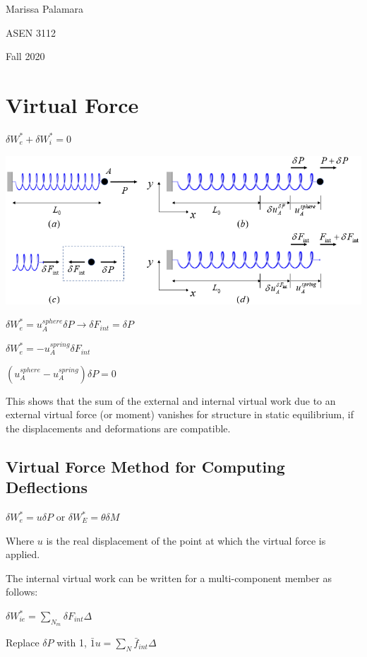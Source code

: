 \documentclass{article}
\begin{document}
\begin{multicols*}{2}
    Marissa Palamara\par 
    ASEN 3112\par 
    Fall 2020
    \vspace{-0.5cm}
    \section*{Virtual Force}
    $\delta W_e^*+\delta W_i^*=0$\par 
    \includegraphics[width=0.666\linewidth]{Figures/Virtual_Force_Springs.png}\par
    $\delta W_e^* = u_A^{sphere} \delta P \rightarrow \delta F_{int}=\delta P$\par 
    $\delta W_e^* = -u_A^{spring} \delta F_{int}$\par 
    $\left(u_A^{sphere}-u_A^{spring}\right)\delta P=0$\par 
    This shows that the sum of the external and internal virtual work due to an 
    external virtual force (or moment) vanishes for structure in static 
    equilibrium, if the displacements and deformations are compatible.

    \subsection*{Virtual Force Method for Computing Deflections}\par 
    $\delta W_e^*=u \delta P$ or $\delta W_E^* = \theta \delta M$ \par 
    Where $u$ is the real displacement of the point at which the virtual force
    is applied. \par 
    The internal virtual work can be written for a multi-component member as follows:\par 
    $\delta W_{ie}^*=\sum\limits_{N_m} \delta F_{int} \Delta$\par 
    Replace $\delta P$ with 1, $\bar{1}u=\sum\limits_N \bar{f}_{int}\Delta$


\end{multicols*}
\end{document}
